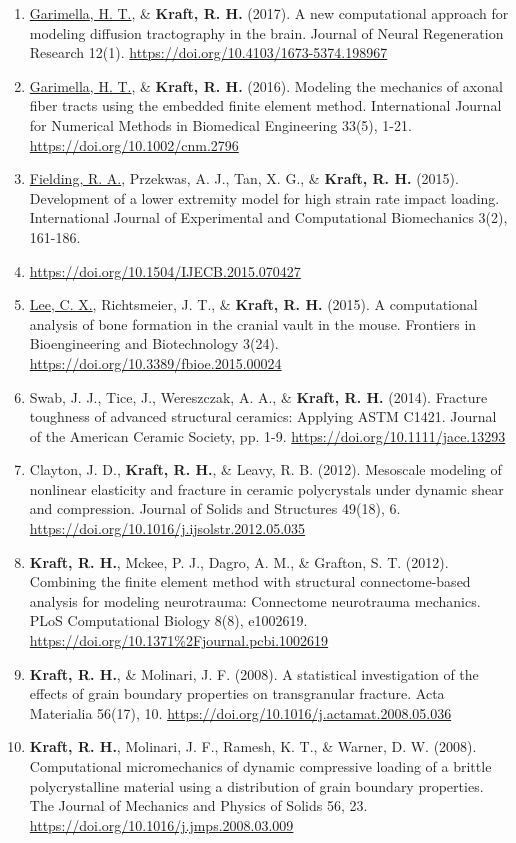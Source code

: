 \documentclass[a4paper,10pt]{article}
\begin{document}
\begin{enumerate}
  \item	\underline{Garimella, H. T.}, \&
 \textbf{\textbf{Kraft,} R. H.} (2017). A new computational approach for modeling diffusion tractography in the brain. Journal of Neural Regeneration Research 12(1). \url{https://doi.org/10.4103/1673-5374.198967}
  \item	\underline{Garimella, H. T.}, \&
 \textbf{\textbf{Kraft,} R. H.} (2016). Modeling the mechanics of axonal fiber tracts using the embedded finite element method. International Journal for Numerical Methods in Biomedical Engineering 33(5), 1-21. \url{https://doi.org/10.1002/cnm.2796}
  \item	\underline{Fielding, R. A.}, Przekwas, A. J., Tan, X. G., \&
 \textbf{\textbf{Kraft,} R. H.} (2015). Development of a lower extremity model for high strain rate impact loading. International Journal of Experimental and Computational Biomechanics 3(2), 161-186.
  \item  \url{https://doi.org/10.1504/IJECB.2015.070427}
  \item	\underline{Lee, C. X.}, Richtsmeier, J. T., \&
 \textbf{\textbf{Kraft,} R. H.} (2015). A computational analysis of bone formation in the cranial vault in the mouse. Frontiers in Bioengineering and Biotechnology 3(24). \url{https://doi.org/10.3389/fbioe.2015.00024}
  \item	Swab, J. J., Tice, J., Wereszczak, A. A., \&
 \textbf{\textbf{Kraft,} R. H.} (2014). Fracture toughness of advanced structural ceramics: Applying ASTM C1421. Journal of the American Ceramic Society, pp. 1-9. \url{https://doi.org/10.1111/jace.13293}
  \item	Clayton, J. D., \textbf{\textbf{Kraft,} R. H.}, \&
 Leavy, R. B. (2012). Mesoscale modeling of nonlinear elasticity and fracture in ceramic polycrystals under dynamic shear and compression. Journal of Solids and Structures 49(18), 6. \url{https://doi.org/10.1016/j.ijsolstr.2012.05.035}
  \item	\textbf{\textbf{Kraft,} R. H.}, Mckee, P. J., Dagro, A. M., \&
 Grafton, S. T. (2012). Combining the finite element method with structural connectome-based analysis for modeling neurotrauma: Connectome neurotrauma mechanics. PLoS Computational Biology 8(8), e1002619. \url{https://doi.org/10.1371%2Fjournal.pcbi.1002619}
  \item	\textbf{\textbf{Kraft,} R. H.}, \&
 Molinari, J. F. (2008). A statistical investigation of the effects of grain boundary properties on transgranular fracture. Acta Materialia 56(17), 10. \url{https://doi.org/10.1016/j.actamat.2008.05.036}
  \item	\textbf{\textbf{Kraft,} R. H.}, Molinari, J. F., Ramesh, K. T., \&
 Warner, D. W. (2008). Computational micromechanics of dynamic compressive loading of a brittle polycrystalline material using a distribution of grain boundary properties. The Journal of Mechanics and Physics of Solids 56, 23. \url{https://doi.org/10.1016/j.jmps.2008.03.009}

\end{enumerate}
\end{document}
